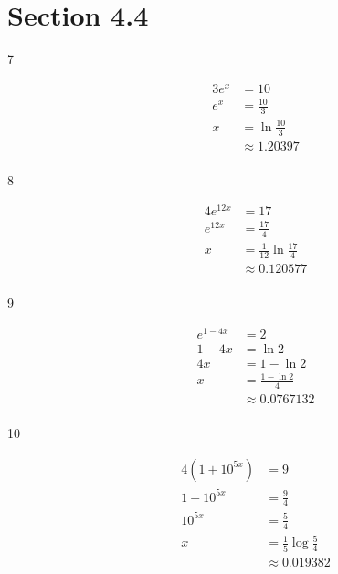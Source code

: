 \documentclass{exam}
\begin{document}
  \ifprintanswers
    \section{Section 4.4}

    \begin{description}

      \item[7]
        \begin{align*}
          3 e^x &= 10 \\
          e^x   &= \frac{10}{3} \\
          x     &= \ln \frac{10}{3} \\
                &\approx \boxed{1.20397} \\
        \end{align*}

      \item[8]
        \begin{align*}
          4 e^{12x} &= 17 \\
          e^{12x}   &= \frac{17}{4} \\
          x         &= \frac{1}{12} \ln \frac{17}{4} \\
                    &\approx \boxed{0.120577} \\
        \end{align*}

      \item[9]
        \begin{align*}
          e^{1 - 4x} &= 2 \\
          1 - 4x     &= \ln 2 \\
          4x         &= 1 - \ln 2 \\
          x          &= \frac{1 - \ln 2}{4} \\
                     &\approx \boxed{0.0767132} \\
        \end{align*}

      \item[10]
        \begin{align*}
          4 (1 + 10^{5x}) &= 9 \\
          1 + 10^{5x}     &= \frac{9}{4} \\
          10^{5x}         &= \frac{5}{4}\\
          x               &= \frac{1}{5} \log \frac{5}{4} \\
                          &\approx \boxed{0.019382} \\
        \end{align*}


\end{description}
\end{document}

